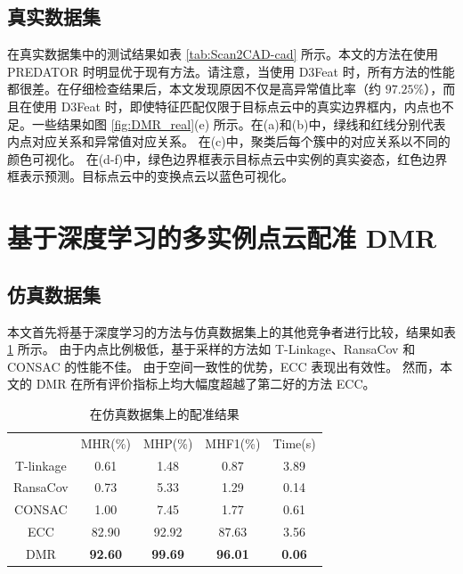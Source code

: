 \subsection{真实数据集}
在真实数据集中的测试结果如表 \ref{tab:Scan2CAD-cad} 所示。本文的方法在使用 PREDATOR 时明显优于现有方法。请注意，当使用 D3Feat 时，所有方法的性能都很差。在仔细检查结果后，本文发现原因不仅是高异常值比率（约 $97.25\%$），而且在使用 D3Feat 时，即使特征匹配仅限于目标点云中的真实边界框内，内点也不足。一些结果如图 \ref{fig:DMR_real}(e) 所示。在(a)和(b)中，绿线和红线分别代表内点对应关系和异常值对应关系。
在(c)中，聚类后每个簇中的对应关系以不同的颜色可视化。
在(d-f)中，绿色边界框表示目标点云中实例的真实姿态，红色边界框表示预测。目标点云中的变换点云以蓝色可视化。


\section{基于深度学习的多实例点云配准 DMR}
\subsection{仿真数据集}
本文首先将基于深度学习的方法与仿真数据集上的其他竞争者进行比较，结果如表 \ref{table1} 所示。
由于内点比例极低，基于采样的方法如 T-Linkage、RansaCov 和 CONSAC 的性能不佳。
由于空间一致性的优势，ECC 表现出有效性。
然而，本文的 DMR 在所有评价指标上均大幅度超越了第二好的方法 ECC。

\setlength{\tabcolsep}{8pt}
\begin{table}[ht]
  \centering
  \caption{在仿真数据集上的配准结果}
  \begin{tabular}{ccccc}
    \hline\noalign{\smallskip}
  & MHR(\%)         & MHP(\%)         & MHF1(\%)         & Time(s)       \\
  \noalign{\smallskip}
  \hline
  \noalign{\smallskip}
  T-linkage  & 0.61           & 1.48           & 0.87           & 3.89          \\
  RansaCov   & 0.73           & 5.33           & 1.29           & 0.14          \\
  CONSAC     & 1.00           & 7.45           & 1.77           & 0.61          \\
  ECC         & 82.90          & 92.92          & 87.63          & 3.56          \\
  DMR              & \textbf{92.60} & \textbf{99.69} & \textbf{96.01} & \textbf{0.06} \\
  \hline
  \end{tabular}
  \label{table1}
\end{table}

